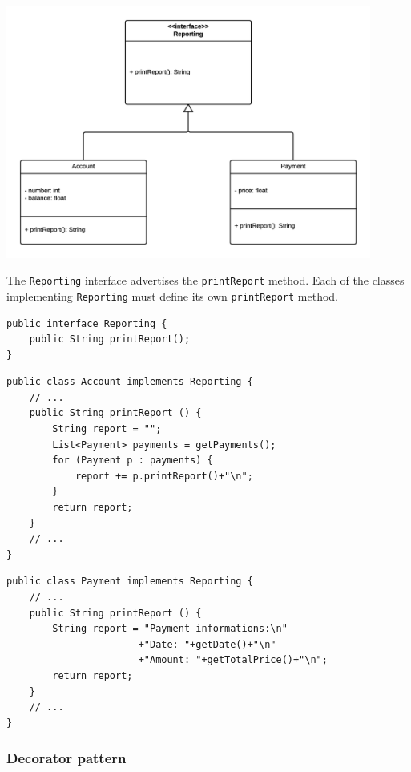 \documentclass[11pt, a4paper]{article}
\newcommand{\settextlisting}{\lstset{ basicstyle=\small\ttfamily }}
\newcommand{\setcodelisting}{\lstset{ basicstyle=\footnotesize\ttfamily }}
\begin{document}
\centerline{\includegraphics[width=0.9\textwidth]{StrategyPattern.png}}

\medskip
\settextlisting
The \lstinline|Reporting| interface advertises the \lstinline|printReport| method.
Each of the classes implementing \lstinline|Reporting| must define its own \lstinline|printReport| method.

\bigskip
\lstset{ basicstyle=\scriptsize\ttfamily }
\begin{lstlisting}
public interface Reporting {
	public String printReport();
}
\end{lstlisting}


\begin{lstlisting}
public class Account implements Reporting {
	// ...
	public String printReport () {
		String report = "";
		List<Payment> payments = getPayments();
		for (Payment p : payments) {
			report += p.printReport()+"\n";
		}
		return report;
	}
	// ...
}
\end{lstlisting}


\begin{lstlisting}
public class Payment implements Reporting {
	// ...
	public String printReport () {
		String report = "Payment informations:\n"
					   +"Date: "+getDate()+"\n"
					   +"Amount: "+getTotalPrice()+"\n";
		return report;
	}
	// ...
}

\end{lstlisting}




\subsubsection*{Decorator pattern}
\end{document}
